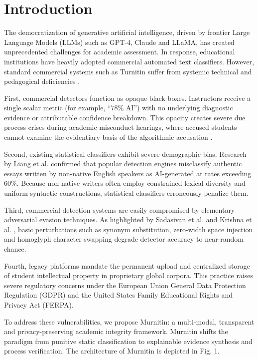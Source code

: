 \documentclass[conference]{IEEEtran}
\begin{document}
\section{Introduction}
The democratization of generative artificial intelligence, driven by frontier Large Language Models (LLMs) such as GPT-4, Claude and LLaMA, has created unprecedented challenges for academic assessment. In response, educational institutions have heavily adopted commercial automated text classifiers. However, standard commercial systems such as Turnitin suffer from systemic technical and pedagogical deficiencies \cite{weberwulff2023testing}.

First, commercial detectors function as opaque black boxes. Instructors receive a single scalar metric (for example, ``78\% AI'') with no underlying diagnostic evidence or attributable confidence breakdown. This opacity creates severe due process crises during academic misconduct hearings, where accused students cannot examine the evidentiary basis of the algorithmic accusation \cite{perkins2023academic}.

Second, existing statistical classifiers exhibit severe demographic bias. Research by Liang et al. \cite{liang2023gpt} confirmed that popular detection engines misclassify authentic essays written by non-native English speakers as AI-generated at rates exceeding 60\%. Because non-native writers often employ constrained lexical diversity and uniform syntactic constructions, statistical classifiers erroneously penalize them.

Third, commercial detection systems are easily compromised by elementary adversarial evasion techniques. As highlighted by Sadasivan et al. \cite{sadasivan2023can} and Krishna et al. \cite{krishna2023paraphrasing}, basic perturbations such as synonym substitution, zero-width space injection and homoglyph character swapping degrade detector accuracy to near-random chance.

Fourth, legacy platforms mandate the permanent upload and centralized storage of student intellectual property in proprietary global corpora. This practice raises severe regulatory concerns under the European Union General Data Protection Regulation (GDPR) and the United States Family Educational Rights and Privacy Act (FERPA).

To address these vulnerabilities, we propose Murnitin: a multi-modal, transparent and privacy-preserving academic integrity framework. Murnitin shifts the paradigm from punitive static classification to explainable evidence synthesis and process verification. The architecture of Murnitin is depicted in Fig. 1.
\end{document}
